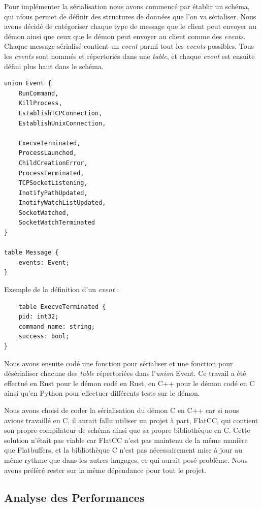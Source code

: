 \documentclass{article}
\begin{document}
Pour implémenter la sérialisation nous avons commencé par établir un schéma, qui nfous permet de définir des structures de données que l'on va sérialiser.
Nous avons décidé de catégoriser chaque type de message que le client peut envoyer au démon ainsi que ceux que le démon peut envoyer au client comme des \textit{events}. Chaque message sérialisé contient un \textit{event} parmi tout les \textit{events} possibles. Tous les \textit{events} sont nommés et répertoriés dans une \textit{table}, et chaque \textit{event} est ensuite défini plus haut dans le schéma.

\begin{verbatim}
union Event {
    RunCommand,
    KillProcess,
    EstablishTCPConnection,
    EstablishUnixConnection,

    ExecveTerminated,
    ProcessLaunched,
    ChildCreationError,
    ProcessTerminated,
    TCPSocketListening,
    InotifyPathUpdated,
    InotifyWatchListUpdated,
    SocketWatched,
    SocketWatchTerminated
}

table Message {
    events: Event;
}
\end{verbatim}

\noindent Exemple de la définition d'un \textit{event} : 

\begin{verbatim}
    table ExecveTerminated {
    pid: int32;
    command_name: string;
    success: bool;
}
\end{verbatim}

Nous avons ensuite codé une fonction pour sérialiser et une fonction pour désérialiser chacune des \textit{table} répertoriées dans l'\textit{union} Event. Ce travail a été effectué en Rust pour le démon codé en Rust, en C++ pour le démon codé en C ainsi qu'en Python pour effectuer différents tests sur le démon. 

Nous avons choisi de coder la sérialisation du démon C en C++ car si nous avions travaillé en C, il aurait fallu utiliser un projet à part, FlatCC, qui contient son propre compilateur de schéma ainsi que sa propre bibliothèque en C. Cette solution n'était pas viable car FlatCC n'est pas maintenu de la même manière que Flatbuffers, et la bibliothèque C n'est pas nécessairement mise à jour au même rythme que dans les autres langages, ce qui aurait posé problème. Nous avons préféré rester sur la même dépendance pour tout le projet.

\subsection{Analyse des Performances}
\end{document}
